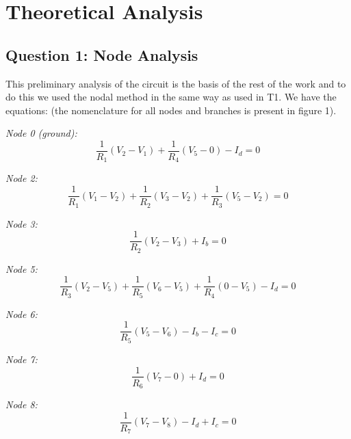\section{Theoretical Analysis}
\label{sec:analysis}

\subsection{Question 1: Node Analysis}
This preliminary analysis of the circuit is the basis of the rest of the work and to do this we used the nodal method in the same way as used in T1. We have the equations: (the nomenclature for all nodes and branches is present in figure 1).\par
\emph{Node 0 (ground):}
\begin{equation}
    \frac{1}{R_1}(V_2-V_1) + \frac{1}{R_4}(V_5-0)- I_d  = 0
\end{equation}\par

\emph{Node 2:}
\begin{equation}
    \frac{1}{R_1}(V_1-V_2) + \frac{1}{R_2}(V_3-V_2) + \frac{1}{R_3}(V_5-V_2) = 0
\end{equation}\par

\emph{Node 3:}
\begin{equation}
    \frac{1}{R_2}(V_2-V_3) + I_b  = 0
\end{equation}\par

\emph{Node 5:}
\begin{equation}
    \frac{1}{R_3}(V_2-V_5) + \frac{1}{R_5}(V_6-V_5) + \frac{1}{R_4}(0-V_5) - I_d = 0
\end{equation}\par

\emph{Node 6:}
\begin{equation}
    \frac{1}{R_5}(V_5-V_6) - I_b - I_c = 0
\end{equation}\par

\emph{Node 7:}
\begin{equation}
    \frac{1}{R_6}(V_7-0) + I_d  = 0
\end{equation}\par

\emph{Node 8:}
\begin{equation}
    \frac{1}{R_7}(V_7-V_8) - I_d + I_c = 0
\end{equation}\par

